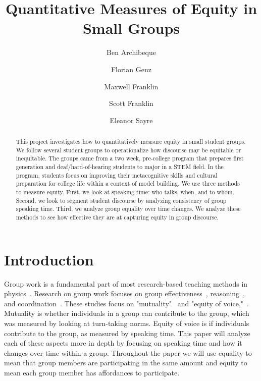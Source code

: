 \documentclass[aps,pra,reprint,noshowpacs,superscriptaddress, nofootinbib]{revtex4-1}
\begin{document}
\title{Quantitative Measures of Equity in Small Groups}
\author{Ben Archibeque}
\author{Florian Genz}
\author{Maxwell Franklin}
\author{Scott Franklin}
\author{Eleanor Sayre}

\begin{abstract}
This project investigates how to quantitatively measure equity in small student groups. We follow several student groups to operationalize how discourse may be equitable or inequitable. The groups came from a two week, pre-college program that prepares first generation and deaf/hard-of-hearing students to major in a STEM field. In the program, students focus on improving their metacognitive skills and cultural preparation for college life within a context of model building. We use three methods to measure equity. First, we look at speaking time: who talks, when, and to whom. Second, we look to segment student discourse by analyzing consistency of group speaking time. Third, we analyze group equality over time changes. We analyze these methods to see how effective they are at capturing equity in group discourse. 

\end{abstract}

\maketitle
\section{Introduction}
Group work is a fundamental part of most research-based teaching methods in physics~\cite{mcdermott_tutorials_2002,keller_research-based_2007,redish_research-based_2007,heller_cooperative_nodate}. Research on group work focuses on group effectiveness~\cite{keil_identifying_2015}, reasoning~\cite{hoehn_conceptual_2016}, and coordination~\cite{barron_achieving_2000}. These studies focus on "mutuality"~\cite{barron_achieving_2000} and "equity of voice,"~\cite{keil_identifying_2015}. Mutuality is whether individuals in a group can contribute to the group, which was measured by looking at turn-taking norms. Equity of voice is if individuals contribute to the group, as measured by speaking time. This paper will analyze each of these aspects more in depth by focusing on speaking time and how it changes over time within a group. Throughout the paper we will use equality to mean that group members are participating in the same amount and equity to mean each group member has affordances to participate.
\end{document}
